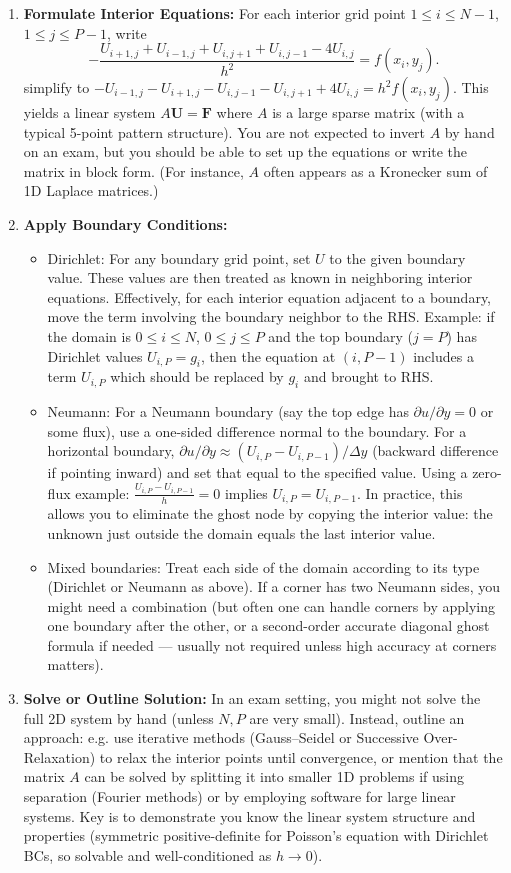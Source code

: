 \documentclass[a4paper,11pt]{report}
\begin{document}
\begin{enumerate}
    \item \textbf{Formulate Interior Equations:} For each interior grid point $1\le i\le N-1$, $1\le j\le P-1$, write
          $$
              - \frac{U_{i+1,j}+U_{i-1,j}+U_{i,j+1}+U_{i,j-1}-4U_{i,j}}{h^2} = f(x_i,y_j).
          $$
          simplify to $-U_{i-1,j} - U_{i+1,j} - U_{i,j-1} - U_{i,j+1} + 4U_{i,j} = h^2 f(x_i,y_j)$.
          This yields a linear system $A\mathbf{U}=\mathbf{F}$ where $A$ is a large sparse matrix (with a typical 5-point pattern structure). You are not expected to invert $A$ by hand on an exam, but you should be able to set up the equations or write the matrix in block form. (For instance, $A$ often appears as a Kronecker sum of 1D Laplace matrices.)
    \item \textbf{Apply Boundary Conditions:}
          \begin{itemize}
              \item Dirichlet: For any boundary grid point, set $U$ to the given boundary value. These values are then treated as known in neighboring interior equations. Effectively, for each interior equation adjacent to a boundary, move the term involving the boundary neighbor to the RHS. Example: if the domain is $0\le i\le N$, $0\le j\le P$ and the top boundary ($j=P$) has Dirichlet values $U_{i,P}=g_i$, then the equation at $(i,P-1)$ includes a term $U_{i,P}$ which should be replaced by $g_i$ and brought to RHS.
              \item Neumann: For a Neumann boundary (say the top edge has $\partial u/\partial y = 0$ or some flux), use a one-sided difference normal to the boundary. For a horizontal boundary, $\partial u/\partial y \approx (U_{i,P} - U_{i,P-1})/\Delta y$ (backward difference if pointing inward) and set that equal to the specified value. Using a zero-flux example: $\frac{U_{i,P} - U_{i,P-1}}{h} = 0$ implies $U_{i,P} = U_{i,P-1}$. In practice, this allows you to eliminate the ghost node by copying the interior value: the unknown just outside the domain equals the last interior value.
              \item Mixed boundaries: Treat each side of the domain according to its type (Dirichlet or Neumann as above). If a corner has two Neumann sides, you might need a combination (but often one can handle corners by applying one boundary after the other, or a second-order accurate diagonal ghost formula if needed — usually not required unless high accuracy at corners matters).
          \end{itemize}
    \item \textbf{Solve or Outline Solution:} In an exam setting, you might not solve the full 2D system by hand (unless $N,P$ are very small). Instead, outline an approach: e.g. use iterative methods (Gauss--Seidel or Successive Over-Relaxation) to relax the interior points until convergence, or mention that the matrix $A$ can be solved by splitting it into smaller 1D problems if using separation (Fourier methods) or by employing software for large linear systems. Key is to demonstrate you know the linear system structure and properties (symmetric positive-definite for Poisson’s equation with Dirichlet BCs, so solvable and well-conditioned as $h\to0$).

\end{enumerate}
\end{document}
